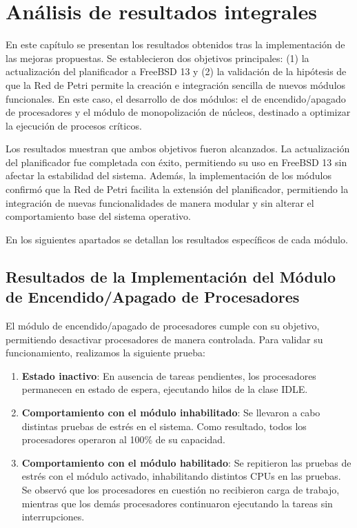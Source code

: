 \chapter{Análisis de resultados integrales}
\label{ch:results}

En este capítulo se presentan los resultados obtenidos tras la implementación de las mejoras propuestas. Se establecieron dos objetivos principales: (1) la actualización del planificador a FreeBSD 13 y (2) la validación de la hipótesis de que la Red de Petri permite la creación e integración sencilla de nuevos módulos funcionales. En este caso, el desarrollo de dos módulos: el de encendido/apagado de procesadores y el módulo de monopolización de núcleos, destinado a optimizar la ejecución de procesos críticos.\par

Los resultados muestran que ambos objetivos fueron alcanzados. La actualización del planificador fue completada con éxito, permitiendo su uso en FreeBSD 13 sin afectar la estabilidad del sistema. Además, la implementación de los módulos confirmó que la Red de Petri facilita la extensión del planificador, permitiendo la integración de nuevas funcionalidades de manera modular y sin alterar el comportamiento base del sistema operativo.\par

En los siguientes apartados se detallan los resultados específicos de cada módulo.\par

\section{Resultados de la Implementación del Módulo de Encendido/Apagado de Procesadores}

El módulo de encendido/apagado de procesadores cumple con su objetivo, permitiendo desactivar procesadores de manera controlada. Para validar su funcionamiento, realizamos la siguiente prueba:

\begin{enumerate}
    \item \textbf{Estado inactivo}: En ausencia de tareas pendientes, los procesadores permanecen en estado de espera, ejecutando hilos de la clase IDLE.\@
    \item \textbf{Comportamiento con el módulo inhabilitado}: Se llevaron a cabo distintas pruebas de estrés en el sistema. Como resultado, todos los procesadores operaron al 100\% de su capacidad.
    \item \textbf{Comportamiento con el módulo habilitado}: Se repitieron las pruebas de estrés con el módulo activado, inhabilitando distintos CPUs en las pruebas. Se observó que los procesadores en cuestión no recibieron carga de trabajo, mientras que los demás procesadores continuaron ejecutando la tareas sin interrupciones.
\end{enumerate}

